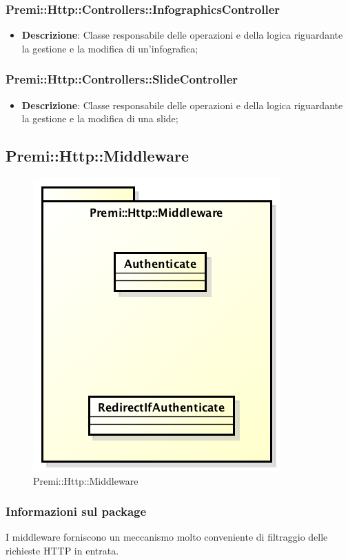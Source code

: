 	\subsubsection*{Premi::Http::Controllers::InfographicsController}
			\begin{itemize}
				\item \textbf{Descrizione}: Classe responsabile delle operazioni e della logica riguardante la gestione e la modifica di un'\gls{infografica};
			\end{itemize}
			
	\subsubsection*{Premi::Http::Controllers::SlideController}
			\begin{itemize}
				\item \textbf{Descrizione}: Classe responsabile delle operazioni e della logica riguardante la gestione e la modifica di una \gls{slide};
			\end{itemize}
		
\newpage
\subsection{Premi::Http::Middleware}
\begin{figure}[h]
\centering
\includegraphics[width=0.6\linewidth]{img/premi_http_middleware}
\caption[Premi::Http::Middleware]{Premi::Http::Middleware}
\label{fig:premi_http_middleware}
\end{figure}

	\subsubsection*{Informazioni sul package}
	I middleware forniscono un meccanismo molto conveniente di filtraggio delle richieste HTTP in entrata.
